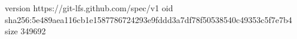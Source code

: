version https://git-lfs.github.com/spec/v1
oid sha256:5e489aea116cb1e1587786724293e9fddd3a7df78f50538540c49353c5f7e7b4
size 349692
